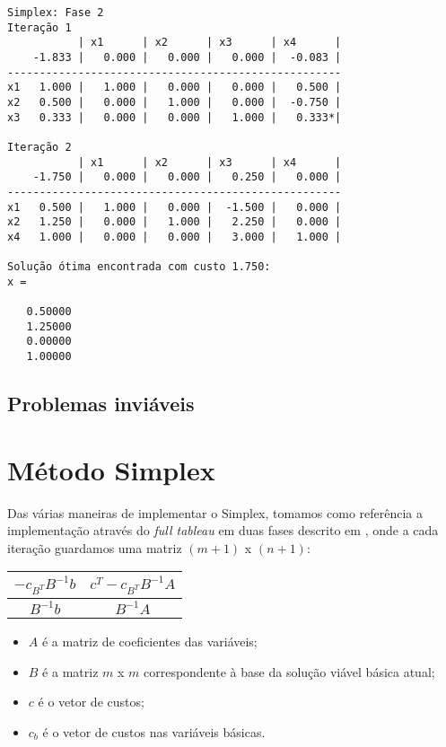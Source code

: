 \documentclass[brazil,times]{abnt}
\begin{document}
{\begin{verbatim}
Simplex: Fase 2
Iteração 1
           | x1      | x2      | x3      | x4      |
    -1.833 |   0.000 |   0.000 |   0.000 |  -0.083 |
----------------------------------------------------
x1   1.000 |   1.000 |   0.000 |   0.000 |   0.500 |
x2   0.500 |   0.000 |   1.000 |   0.000 |  -0.750 |
x3   0.333 |   0.000 |   0.000 |   1.000 |   0.333*|

Iteração 2
           | x1      | x2      | x3      | x4      |
    -1.750 |   0.000 |   0.000 |   0.250 |   0.000 |
----------------------------------------------------
x1   0.500 |   1.000 |   0.000 |  -1.500 |   0.000 |
x2   1.250 |   0.000 |   1.000 |   2.250 |   0.000 |
x4   1.000 |   0.000 |   0.000 |   3.000 |   1.000 |

Solução ótima encontrada com custo 1.750:
x =

   0.50000
   1.25000
   0.00000
   1.00000
\end{verbatim} }


\subsection*{Problemas inviáveis}

\section*{Método Simplex}
Das várias maneiras de implementar o Simplex, tomamos como referência a implementação através do \emph{full tableau} em duas fases descrito em \cite{Bertsimas:1997:ILO:548834}, onde a cada iteração guardamos uma matriz $(m + 1)$ x $(n + 1)$:

\begin{center}
  \begin{tabular}{ | c | c | }
    \hline
    $-c_{B^T}B^{-1}b$ & $c^T - c_{B^T}B^{-1}A$ \\ \hline
    $B^{-1}b$ & $B^{-1}A$ \\ \hline
  \end{tabular}
\end{center}

\begin{itemize}
	\item[] $A$ é a matriz de coeficientes das variáveis;
	\item[] $B$ é a matriz $m$ x $m$ correspondente à base da solução viável básica atual;
	\item[] $c$ é o vetor de custos;
	\item[] $c_b$ é o vetor de custos nas variáveis básicas.
\end{itemize}
\end{document}

